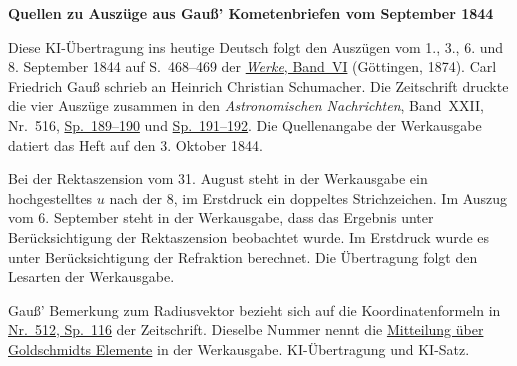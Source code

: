 \clearpage\thispagestyle{empty}
\begin{center}\textbf{Quellen zu Auszüge aus Gauß’ Kometenbriefen vom September 1844}\end{center}
\noindent Diese KI-Übertragung ins heutige Deutsch folgt den Auszügen vom 1., 3., 6. und 8. September 1844 auf S.~468--469 der \href{https://gdz.sub.uni-goettingen.de/id/PPN236007467}{\textit{Werke}, Band~VI} (Göttingen, 1874). Carl Friedrich Gauß schrieb an Heinrich Christian Schumacher. Die Zeitschrift druckte die vier Auszüge zusammen in den \textit{Astronomischen Nachrichten}, Band~XXII, Nr.~516, \href{https://api.digitale-sammlungen.de/iiif/image/v2/bsb10049447_00103/full/1800,/0/default.jpg}{Sp.~189--190} und \href{https://api.digitale-sammlungen.de/iiif/image/v2/bsb10049447_00104/full/1800,/0/default.jpg}{Sp.~191--192}. Die Quellenangabe der Werkausgabe datiert das Heft auf den 3. Oktober 1844.
\par\smallskip\noindent Bei der Rektaszension vom 31. August steht in der Werkausgabe ein hochgestelltes \(u\) nach der 8, im Erstdruck ein doppeltes Strichzeichen. Im Auszug vom 6. September steht in der Werkausgabe, dass das Ergebnis unter Berücksichtigung der Rektaszension beobachtet wurde. Im Erstdruck wurde es unter Berücksichtigung der Refraktion berechnet. Die Übertragung folgt den Lesarten der Werkausgabe.
\par\smallskip\noindent Gauß’ Bemerkung zum Radiusvektor bezieht sich auf die Koordinatenformeln in \href{https://api.digitale-sammlungen.de/iiif/image/v2/bsb10049447_00066/full/1800,/0/default.jpg}{Nr.~512, Sp.~116} der Zeitschrift. Dieselbe Nummer nennt die \hyperlink{native-472-notice}{Mitteilung über Goldschmidts Elemente} in der Werkausgabe. KI-Übertragung und KI-Satz.
\clearpage
